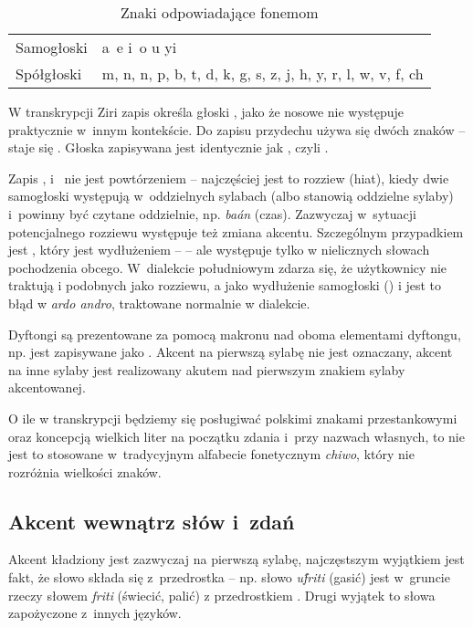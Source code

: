 \begin{spacing}{1.1}
\begin{table}[ht]
\centering
\caption{Znaki odpowiadające fonemom}
\begin{tabular}{ll} \toprule
	Samogłoski & a~e i~o u yi \\
	Spółgłoski & m, n, n, p, b, t, d, k, g, s, z, j, h, y, r, l, w, v, f, ch \\\bottomrule
\end{tabular}
\label{tab:chars}
\end{table}

W transkrypcji Ziri zapis  określa głoski , jako że nosowe
 nie występuje praktycznie w~innym kontekście. Do zapisu przydechu używa
się dwóch znaków --  staje się . Głoska  zapisywana jest
identycznie jak , czyli .

\skipline

Zapis ,  i~ nie jest powtórzeniem -- najczęściej jest to
rozziew (hiat), kiedy dwie samogłoski występują w~oddzielnych sylabach (albo
stanowią oddzielne sylaby) i~powinny być czytane oddzielnie, np. \emph{baán}
 (czas). Zazwyczaj w~sytuacji potencjalnego rozziewu występuje też
zmiana akcentu. Szczególnym przypadkiem jest , który jest wydłużeniem --
 -- ale występuje tylko w nielicznych słowach pochodzenia obcego.
W~dialekcie południowym zdarza się, że użytkownicy nie traktują  i
podobnych jako rozziewu, a jako wydłużenie samogłoski () i jest to błąd w
\emph{ardo andro}, traktowane normalnie w dialekcie.

Dyftongi są prezentowane za pomocą makronu nad oboma elementami dyftongu, np.
 jest zapisywane jako . Akcent na pierwszą sylabę nie jest
oznaczany, akcent na inne sylaby jest realizowany akutem nad pierwszym znakiem
sylaby akcentowanej.

O ile w transkrypcji będziemy się posługiwać polskimi znakami przestankowymi
oraz koncepcją wielkich liter na początku zdania i~przy nazwach własnych, to nie
jest to stosowane w~tradycyjnym alfabecie fonetycznym \emph{chiwo}, który nie
rozróżnia wielkości znaków.

\subsection{Akcent wewnątrz słów i~zdań}

Akcent kładziony jest zazwyczaj na pierwszą sylabę, najczęstszym wyjątkiem jest
fakt, że słowo składa się z~przedrostka -- np. słowo \emph{uf́riti}
 (gasić) jest w~gruncie rzeczy słowem \emph{friti} 
(świecić, palić) z przedrostkiem . Drugi wyjątek to słowa zapożyczone
z~innych języków.


\end{spacing}
